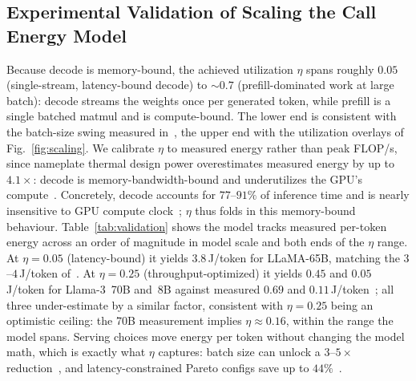 \documentclass[journal]{IEEEtran}
\newif\ifshowchanges \showchangestrue
\newcommand{\NEW}{\ifshowchanges\color{blue}\fi}
\newcommand{\OLD}{\ifshowchanges\color{black}\fi}
\begin{document}
\subsection{Experimental Validation of Scaling the Call Energy Model} Because decode is memory-bound, the achieved utilization
$\eta$ spans roughly $0.05$ (single-stream, latency-bound \NEW{}decode\OLD{}) to \NEW{}$\sim\!0.7$
(prefill-dominated work at large batch): decode streams the weights once per generated token, while
prefill is a single batched matmul and is compute-bound\OLD{}. The lower end is
consistent with the batch-size swing measured in~\cite{mlenergy2025}\NEW{}, the upper end with the
utilization overlays of Fig.~\ref{fig:scaling}\OLD{}.
We calibrate $\eta$ to measured energy rather than peak FLOP/s, since nameplate thermal design power  overestimates
measured energy by up to $4.1\times$: decode is memory-bandwidth-bound and underutilizes the GPU's
compute~\cite{mlenergy2025,decode_membound2025}. Concretely, decode accounts for $77$--$91\%$ of
inference time and is nearly insensitive to GPU compute clock~\cite{decode_membound2025}; $\eta$ thus
folds in this memory-bound behaviour. Table~\ref{tab:validation} shows the model tracks measured per-token energy across an
order of magnitude in model scale and both ends of the $\eta$ range. At $\eta=0.05$
(latency-bound) it yields $3.8$\,J/token for LLaMA-65B, matching the $3$--$4$\,J/token
of~\cite{samsi2023words}. At $\eta=0.25$ (throughput-optimized) it yields $0.45$ and
$0.05$\,J/token for Llama-3~70B and~8B against measured $0.69$ and
$0.11$\,J/token~\cite{tokenpowerbench2026}; \NEW{}all three under-estimate by a similar factor\OLD{},
consistent with $\eta=0.25$ being an optimistic ceiling: the 70B measurement implies
$\eta\approx0.16$, within the range the model spans.  Serving choices move energy per
token without changing the model math, which is exactly what $\eta$ captures: batch
size can unlock a $3$--$5\times$ reduction~\cite{mlenergy_v3}, and latency-constrained
Pareto configs save up to $44\%$~\cite{mlenergy2025}.
\end{document}
